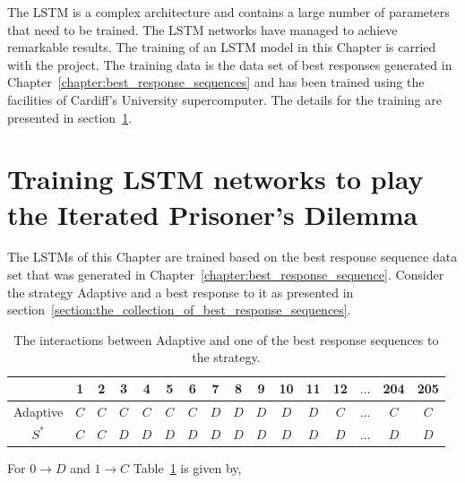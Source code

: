 The LSTM is a complex architecture and contains a large number of parameters
that need to be trained. The LSTM networks have managed to achieve remarkable
results. The training of an LSTM model in this Chapter is carried with the
project. The training data is the data set of best responses generated in
Chapter~\ref{chapter:best_response_sequences} and has been trained using the
facilities of Cardiff's University supercomputer. The details for the training
are presented in section~\ref{section:training_a_rnn}.

\section{Training LSTM networks to play the Iterated Prisoner's Dilemma}\label{section:training_a_rnn}

The LSTMs of this Chapter are trained based on the best response sequence
data set that was generated in Chapter~\ref{chapter:best_response_sequence}.
Consider the strategy Adaptive and a best response to it as presented in
section~\ref{section:the_collection_of_best_response_sequences}.

\begin{table}[htb]
    \centering
    \begin{tabular}{cccccccccccccccc}
        & \textbf{1} & \textbf{2} & \textbf{3} & \textbf{4}  & \textbf{5} & \textbf{6} & \textbf{7} & \textbf{8} & \textbf{9} & \textbf{10} & \textbf{11}  & \textbf{12} &  \(\dots\)  & \textbf{204} &  \textbf{205} \\ 
        \midrule
        Adaptive & \(C\) & \(C\) & \(C\) & \(C\) & \(C\) & \(C\) & \(D\) & \(D\) & \(D\) & \(D\) & \(D\)& \(C\)& \(\dots\) & \(C\) & \(C\) \\
        \(S^*\) & \(C\) & \(C\) & \(D\) & \(D\) & \(D\) & \(D\) & \(D\) & \(D\) & \(D\) & \(D\) & \(D\) & \(D\)& \(\dots\) & \(D\) & \(D\) \\ \bottomrule
    \end{tabular}
    \caption{The interactions between Adaptive and one of the best response sequences
    to the strategy.}\label{table:adaptive_vs_best_response}
    \end{table}

For \(0 \to D\) and \(1 \to C\) Table~\ref{table:adaptive_vs_best_response} is given by,

